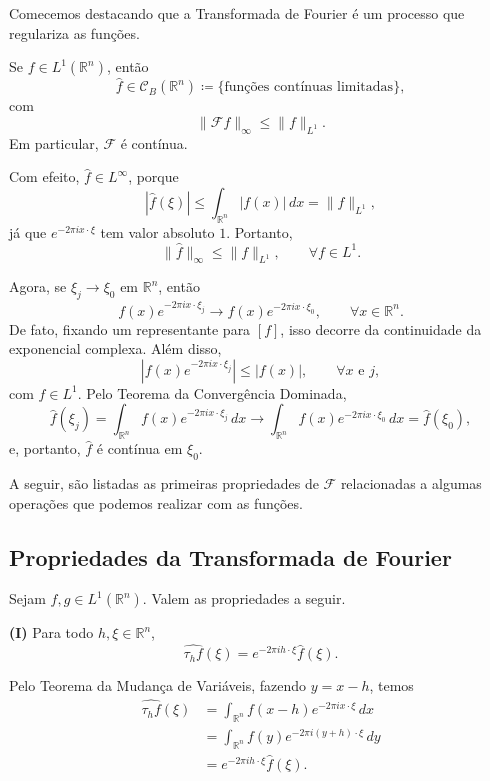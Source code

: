 \documentclass[../distribution_theory_notes.tex]{subfiles}
\begin{document}
Comecemos destacando que a Transformada de Fourier é um processo que regulariza as funções.

\begin{prop*}
	Se $f\in L^{1}(\mathbb{R}^{n})$, então
	\[
		\widehat f\in \mathcal{C}_{B}(\mathbb{R}^{n})
		\coloneqq
		\{\text{funções contínuas limitadas}\},
	\]
	com
	\[
		\|\mathcal{F}f\|_{\infty}\leq \|f\|_{L^{1}}.
	\]
	Em particular, $\mathcal{F}$ é contínua.
\end{prop*}

\begin{proof*}
	Com efeito, $\widehat f\in L^{\infty}$, porque
	\[
		|\widehat f(\xi)|
		\leq
		\int_{\mathbb{R}^{n}}|f(x)|\,dx
		=\|f\|_{L^{1}},
	\]
	já que $e^{-2\pi i x\cdot\xi}$ tem valor absoluto $1$. Portanto,
	\[
		\|\widehat f\|_{\infty}\leq\|f\|_{L^{1}},
		\qquad \forall f\in L^{1}.
	\]

	Agora, se $\xi_{j}\to\xi_{0}$ em $\mathbb{R}^{n}$, então
	\[
		f(x)e^{-2\pi i x\cdot\xi_{j}}
		\longrightarrow
		f(x)e^{-2\pi i x\cdot\xi_{0}},
		\qquad \forall x\in\mathbb{R}^{n}.
	\]
	De fato, fixando um representante para $[f]$, isso decorre da continuidade da exponencial complexa. Além disso,
	\[
		\left|f(x)e^{-2\pi i x\cdot\xi_{j}}\right|
		\leq |f(x)|,
		\qquad \forall x\text{ e }j,
	\]
	com $f\in L^{1}$. Pelo Teorema da Convergência Dominada,
	\[
		\widehat f(\xi_{j})
		=
		\int_{\mathbb{R}^{n}}f(x)e^{-2\pi i x\cdot\xi_{j}}\,dx
		\longrightarrow
		\int_{\mathbb{R}^{n}}f(x)e^{-2\pi i x\cdot\xi_{0}}\,dx
		=\widehat f(\xi_{0}),
	\]
	e, portanto, $\widehat f$ é contínua em $\xi_{0}$. \qedsymbol
\end{proof*}

A seguir, são listadas as primeiras propriedades de $\mathcal{F}$ relacionadas a algumas operações que podemos realizar com as funções.

\subsection{Propriedades da Transformada de Fourier}
Sejam $f,g\in L^{1}(\mathbb{R}^{n})$. Valem as propriedades a seguir.

\medskip
\noindent\textbf{(I)} Para todo $h,\xi\in\mathbb{R}^{n}$,
\[
	\widehat{\tau_{h}f}(\xi)
	=e^{-2\pi i h\cdot\xi}\widehat f(\xi).
\]

\begin{proof*}
	Pelo Teorema da Mudança de Variáveis, fazendo $y=x-h$, temos
	\begin{align*}
		\widehat{\tau_{h}f}(\xi)
		 & =\int_{\mathbb{R}^{n}}f(x-h)e^{-2\pi i x\cdot\xi}\,dx   \\
		 & =\int_{\mathbb{R}^{n}}f(y)e^{-2\pi i (y+h)\cdot\xi}\,dy \\
		 & =e^{-2\pi i h\cdot\xi}\widehat f(\xi).
	\end{align*}
	\qedsymbol
\end{proof*}
\end{document}
